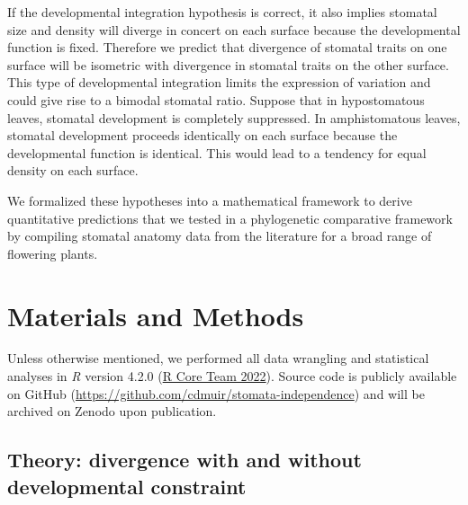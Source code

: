 \documentclass[
  12pt,
]{article}
\begin{document}

If the developmental integration hypothesis is correct, it also implies stomatal size and density will diverge in concert on each surface because the developmental function is fixed. Therefore we predict that divergence of stomatal traits on one surface will be isometric with divergence in stomatal traits on the other surface. This type of developmental integration limits the expression of variation and could give rise to a bimodal stomatal ratio. Suppose that in hypostomatous leaves, stomatal development is completely suppressed. In amphistomatous leaves, stomatal development proceeds identically on each surface because the developmental function is identical. This would lead to a tendency for equal density on each surface.

We formalized these hypotheses into a mathematical framework to derive quantitative predictions that we tested in a phylogenetic comparative framework by compiling stomatal anatomy data from the literature for a broad range of flowering plants.

\hypertarget{materials-and-methods}{%
\section{Materials and Methods}\label{materials-and-methods}}

Unless otherwise mentioned, we performed all data wrangling and statistical analyses in \emph{R} version 4.2.0 (\protect\hyperlink{ref-r_core_team_r:_2022}{R Core Team 2022}). Source code is publicly available on GitHub (\url{https://github.com/cdmuir/stomata-independence}) and will be archived on Zenodo upon publication.

\hypertarget{theory-divergence-with-and-without-developmental-constraint}{%
\subsection{Theory: divergence with and without developmental constraint}\label{theory-divergence-with-and-without-developmental-constraint}}
\end{document}
